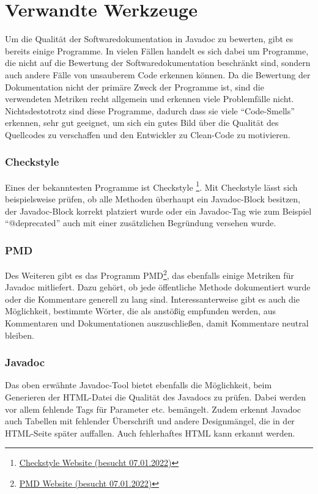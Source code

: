 \section{Verwandte Werkzeuge}
Um die Qualität der Softwaredokumentation in Javadoc zu bewerten, gibt es bereits einige Programme. In vielen Fällen handelt es sich dabei um Programme, die nicht auf die Bewertung der Softwaredokumentation beschränkt sind, sondern auch andere Fälle von unsauberem Code erkennen können. Da die Bewertung der Dokumentation nicht der primäre Zweck der Programme ist, sind die verwendeten Metriken recht allgemein und erkennen viele Problemfälle nicht. Nichtsdestotrotz sind diese Programme, dadurch dass sie viele \enquote{Code-Smells} erkennen, sehr gut geeignet, um sich ein gutes Bild über die Qualität des Quellcodes zu verschaffen und den Entwickler zu Clean-Code zu motivieren. 
\subsubsection{Checkstyle}
Eines der bekanntesten Programme ist Checkstyle \footnote{\href{https://checkstyle.sourceforge.io/}{Checkstyle Website (besucht 07.01.2022)}}. Mit Checkstyle lässt sich beispielsweise prüfen, ob alle Methoden überhaupt ein Javadoc-Block besitzen, der Javadoc-Block korrekt platziert wurde oder ein Javadoc-Tag wie zum Beispiel \enquote{@deprecated} auch mit einer zusätzlichen Begründung versehen wurde. 
\subsubsection{PMD}
Des Weiteren gibt es das Programm PMD\footnote{\href{https://pmd.github.io/}{PMD Website (besucht 07.01.2022)}}, das ebenfalls einige Metriken für Javadoc mitliefert. Dazu gehört, ob jede öffentliche Methode dokumentiert wurde oder die Kommentare generell zu lang sind. Interessanterweise gibt es auch die Möglichkeit, bestimmte Wörter, die als anstößig empfunden werden, aus Kommentaren und Dokumentationen auszuschließen, damit Kommentare neutral bleiben. 
\subsubsection{Javadoc}
Das oben erwähnte Javadoc-Tool bietet ebenfalls die Möglichkeit, beim Generieren der HTML-Datei die Qualität des Javadocs zu prüfen. Dabei werden vor allem fehlende Tags für Parameter etc. bemängelt. Zudem erkennt Javadoc auch Tabellen mit fehlender Überschrift und andere Designmängel, die in der HTML-Seite später auffallen. Auch fehlerhaftes HTML kann erkannt werden.

